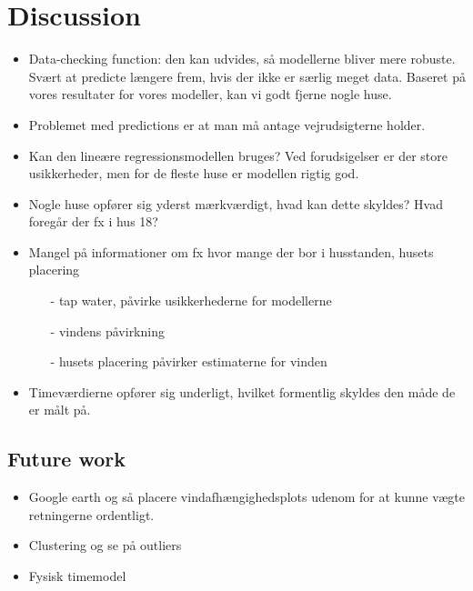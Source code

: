 \chapter{Discussion}
\label{chap: discussion}

\begin{itemize}
    \item Data-checking function: den kan udvides, så modellerne bliver mere robuste. Svært at predicte længere frem, hvis der ikke er særlig meget data. Baseret på vores resultater for vores modeller, kan vi godt fjerne nogle huse.
    \item Problemet med predictions er at man må antage vejrudsigterne holder.
    \item Kan den lineære regressionsmodellen bruges? Ved forudsigelser er der store usikkerheder, men for de fleste huse er modellen rigtig god. 
    \item Nogle huse opfører sig yderst mærkværdigt, hvad kan dette skyldes? Hvad foregår der fx i hus 18?
    \item Mangel på informationer om fx hvor mange der bor i husstanden, husets placering \begin{itemize}
        \item[-] tap water, påvirke usikkerhederne for modellerne
        \item[-] vindens påvirkning
        \item[-] husets placering påvirker estimaterne for vinden  
    \end{itemize}
    \item Timeværdierne opfører sig underligt, hvilket formentlig skyldes den måde de er målt på. 
\end{itemize}

\section{Future work}
\begin{itemize}
    \item Google earth og så placere vindafhængighedsplots udenom for at kunne vægte retningerne ordentligt. 
    \item Clustering og se på outliers
    \item Fysisk timemodel 
\end{itemize}